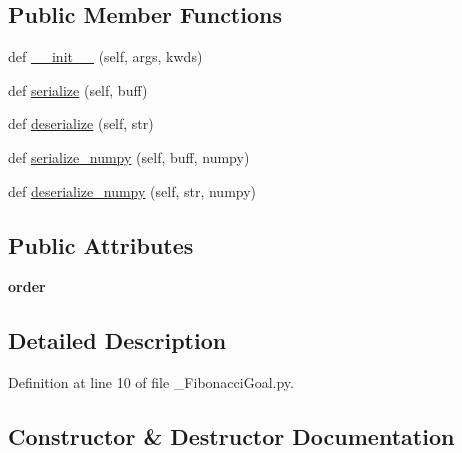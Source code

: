 \subsection*{Public Member Functions}
\begin{DoxyCompactItemize}
\item 
def \hyperlink{classlearning__actionlib_1_1msg_1_1__FibonacciGoal_1_1FibonacciGoal_ae0f116fd45d570901eb4d548735cbd8b}{\+\_\+\+\_\+init\+\_\+\+\_\+} (self, args, kwds)
\item 
def \hyperlink{classlearning__actionlib_1_1msg_1_1__FibonacciGoal_1_1FibonacciGoal_aecd7a893cadcc8fba43dcfd77664df0f}{serialize} (self, buff)
\item 
def \hyperlink{classlearning__actionlib_1_1msg_1_1__FibonacciGoal_1_1FibonacciGoal_aa6e46f39ee2f8fa0d0e072402304d9cd}{deserialize} (self, str)
\item 
def \hyperlink{classlearning__actionlib_1_1msg_1_1__FibonacciGoal_1_1FibonacciGoal_a43147207edcf4b114d2be0034cceb567}{serialize\+\_\+numpy} (self, buff, numpy)
\item 
def \hyperlink{classlearning__actionlib_1_1msg_1_1__FibonacciGoal_1_1FibonacciGoal_ae90de69fd85a2643e37a6be9f613b312}{deserialize\+\_\+numpy} (self, str, numpy)
\end{DoxyCompactItemize}
\subsection*{Public Attributes}
\begin{DoxyCompactItemize}
\item 
\mbox{\label{classlearning__actionlib_1_1msg_1_1__FibonacciGoal_1_1FibonacciGoal_aa3f6aa89e6a9bfd87ad7f70f45db2818}} 
{\bfseries order}
\end{DoxyCompactItemize}


\subsection{Detailed Description}


Definition at line 10 of file \+\_\+\+Fibonacci\+Goal.\+py.



\subsection{Constructor \& Destructor Documentation}
\mbox{\label{classlearning__actionlib_1_1msg_1_1__FibonacciGoal_1_1FibonacciGoal_ae0f116fd45d570901eb4d548735cbd8b}} 

